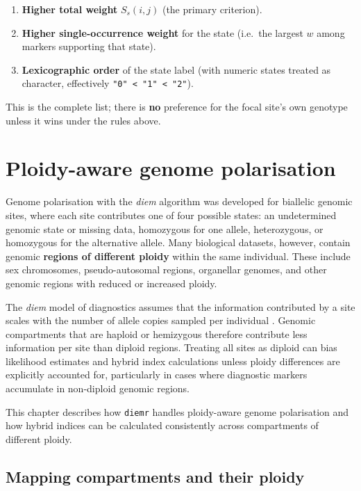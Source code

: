 \documentclass[
]{book}
\providecommand{\tightlist}{%
  \setlength{\itemsep}{0pt}\setlength{\parskip}{0pt}}
\begin{document}
\begin{enumerate}
\def\labelenumi{\arabic{enumi}.}
\tightlist
\item
  \textbf{Higher total weight} \(S_s(i,j)\) (the primary criterion).
\item
  \textbf{Higher single-occurrence weight} for the state (i.e.~the largest \(w\) among markers supporting that state).
\item
  \textbf{Lexicographic order} of the state label (with numeric states treated as character, effectively \texttt{"0"\ \textless{}\ "1"\ \textless{}\ "2"}).
\end{enumerate}

This is the complete list; there is \textbf{no} preference for the focal site's own genotype unless it wins under the rules above.

\chapter{Ploidy-aware genome polarisation}\label{ploidy2}

Genome polarisation with the \emph{diem} algorithm was developed for biallelic genomic sites, where each site contributes one of four possible states: an undetermined genomic state or missing data, homozygous for one allele, heterozygous, or homozygous for the alternative allele. Many biological datasets, however, contain genomic \textbf{regions of different ploidy} within the same individual. These include sex chromosomes, pseudo-autosomal regions, organellar genomes, and other genomic regions with reduced or increased ploidy.

The \emph{diem} model of diagnostics assumes that the information contributed by a site scales with the number of allele copies sampled per individual \citep{Baird2023}. Genomic compartments that are haploid or hemizygous therefore contribute less information per site than diploid regions. Treating all sites as diploid can bias likelihood estimates and hybrid index calculations unless ploidy differences are explicitly accounted for, particularly in cases where diagnostic markers accumulate in non-diploid genomic regions.

This chapter describes how \texttt{diemr} handles ploidy-aware genome polarisation and how hybrid indices can be calculated consistently across compartments of different ploidy.

\section{Mapping compartments and their ploidy}\label{mapping-compartments-and-their-ploidy}
\end{document}
